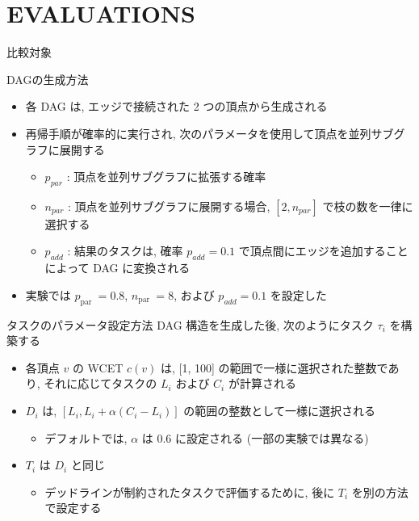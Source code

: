 
\section{EVALUATIONS}
\label{sec: evaluations}

\begin{frame}{比較対象}
\end{frame}

\begin{frame}{DAGの生成方法}
    \begin{itemize}
        \item 各 DAG は, エッジで接続された 2 つの頂点から生成される
        \item 再帰手順が確率的に実行され, 次のパラメータを使用して頂点を並列サブグラフに展開する
              \begin{itemize}
                  \item  $p_{p a r}$ : 頂点を並列サブグラフに拡張する確率

                  \item  $n_{par}$ : 頂点を並列サブグラフに展開する場合, $\left[2, n_{p a r}\right]$ で枝の数を一律に選択する

                  \item  $p_{a d d}$ : 結果のタスクは, 確率 $p_{a d d}=0.1$ で頂点間にエッジを追加することによって DAG に変換される

              \end{itemize}
        \item 実験では $p_{\text {par }}=0.8$, $n_{\text {par }}=8$, および $p_{a d d}=0.1$ を設定した
    \end{itemize}
\end{frame}

\begin{frame}{タスクのパラメータ設定方法}
    DAG 構造を生成した後, 次のようにタスク $\tau_{i}$ を構築する

    \begin{itemize}
        \item  各頂点 $v$ の WCET $c(v)$ は, [1, 100] の範囲で一様に選択された整数であり, それに応じてタスクの $L_{i}$ および $C_{i}$ が計算される

        \item $D_{i}$ は, $\left[L_{i}, L_{i}+\alpha\left(C_{i}-L_{i}\right)\right]$ の範囲の整数として一様に選択される
              \begin{itemize}
                  \item デフォルトでは, $\alpha$ は $0.6$ に設定される (一部の実験では異なる)
              \end{itemize}
        \item $T_{i}$ は $D_{i}$ と同じ
              \begin{itemize}
                  \item デッドラインが制約されたタスクで評価するために, 後に $T_{i}$ を別の方法で設定する
              \end{itemize}

    \end{itemize}
\end{frame}

